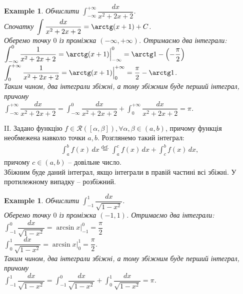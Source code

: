\documentclass[a4paper, 10pt]{article}
\theoremstyle{theoremdd}
\theoremstyle{theoremdd}
\theoremstyle{theoremdd}
\theoremstyle{theoremdd}
\theoremstyle{theoremdd}
\newtheorem{example}[theorem]{Example}
\theoremstyle{theoremdd}
\theoremstyle{theoremdd}
\theoremstyle{theoremdd}
\theoremstyle{theoremdd}
\begin{document}
\begin{example}
Обчислити $\displaystyle\int_{-\infty}^{+\infty} \dfrac{dx}{x^2+2x+2}$.\\
Спочатку $\displaystyle\int \dfrac{dx}{x^2+2x+2} = \arctg (x+1) + C$.\\
Оберемо точку $0$ із проміжка $(-\infty,+\infty)$. Отримаємо два інтеграли:\\
$\displaystyle\int_{-\infty}^0 \dfrac{1}{x^2+2x+2} = \arctg(x+1) \Big|_{-\infty}^0 = \arctg 1 - \left( - \dfrac{\pi}{2} \right)$\\
$\displaystyle\int_0^{+\infty} \dfrac{1}{x^2+2x+2} = \arctg(x+1) \Big|_0^{+\infty} = \dfrac{\pi}{2} - \arctg 1$.\\
Таким чином, два інтеграли збіжні, а тому збіжним буде перший інтеграл, причому\\
$\displaystyle\int_{-\infty}^{+\infty} \dfrac{dx}{x^2+2x+2} = \int_{-\infty}^{0} \dfrac{dx}{x^2+2x+2} + \int_{0}^{+\infty} \dfrac{dx}{x^2+2x+2} = \pi$.
\end{example}

II. Задано функцію $f \in \mathcal{R}([\alpha,\beta]), \forall \alpha,\beta \in (a,b)$, причому функція необмежена навколо точки $a,b$. Розглянемо такий інтеграл:
\begin{align*}
\int_a^b f(x)\,dx \overset{\text{def.}}{=} \int_a^c f(x)\,dx + \int_c^b f(x)\,dx,
\end{align*}
причому $c \in (a,b)$ -- довільне число.\\
Збіжним буде даний інтеграл, якщо інтеграли в правій частині всі збіжні. У протилежному випадку -- розбіжний.

\begin{example}
Обчислити $\displaystyle\int_{-1}^1 \dfrac{dx}{\sqrt{1-x^2}}$.\\
Оберемо точку $0$ із проміжка $(-1,1)$. Отримаємо два інтеграли:\\
$\displaystyle\int_{-1}^0 \dfrac{dx}{\sqrt{1-x^2}} = \arcsin x \Big|_{-1}^0 = \dfrac{\pi}{2}$\\
$\displaystyle\int_0^1 \dfrac{dx}{\sqrt{1-x^2}} = \arcsin x \Big|_0^1 = \dfrac{\pi}{2}$.\\
Таким чином, два інтеграли збіжні, а тому збіжним буде перший інтеграл, причому\\
$\displaystyle\int_{-1}^1 \dfrac{dx}{\sqrt{1-x^2}} = \int_{-1}^0 \dfrac{dx}{\sqrt{1-x^2}} + \int_{0}^1 \dfrac{dx}{\sqrt{1-x^2}} = \pi$.
\end{example}
\end{document}

